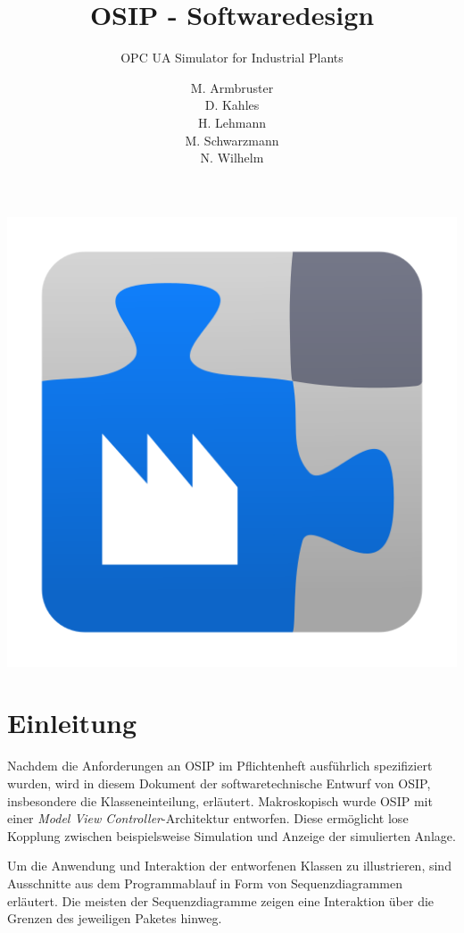 \documentclass[parskip=full]{scrartcl}
\title{OSIP - Softwaredesign}
\subtitle{OPC UA Simulator for Industrial Plants}
\author{
    M. Armbruster\\
    D. Kahles\\
    H. Lehmann\\
    M. Schwarzmann\\
    N. Wilhelm
}
\begin{document}
\maketitle

\vspace{20px}
\begin{center}
  \includegraphics[scale=0.4]{../icon.png}
\end{center}
\pagebreak
\tableofcontents
\pagebreak

\section{Einleitung}
Nachdem die Anforderungen an OSIP im Pflichtenheft ausführlich spezifiziert wurden, wird in diesem Dokument
der softwaretechnische Entwurf von OSIP, insbesondere die Klasseneinteilung, erläutert. Makroskopisch wurde OSIP
mit einer \emph{Model View Controller}-Architektur entworfen. Diese ermöglicht
lose Kopplung zwischen beispielsweise Simulation und Anzeige der simulierten Anlage.

Um die Anwendung und Interaktion der entworfenen Klassen zu illustrieren, sind Ausschnitte aus dem Programmablauf
in Form von Sequenzdiagrammen erläutert. Die meisten der Sequenzdiagramme zeigen eine Interaktion über die Grenzen
des jeweiligen Paketes hinweg.
\end{document}
